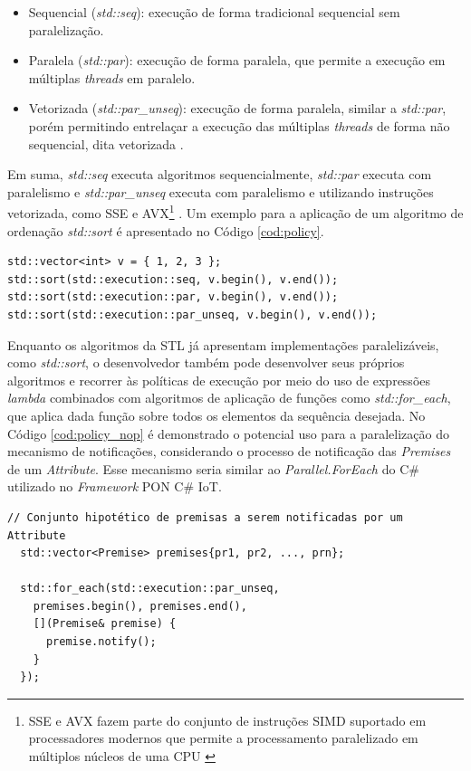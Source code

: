 \begin{itemize}
  \item Sequencial (\textit{std::seq}): execução de forma tradicional sequencial
        sem paralelização.
  \item Paralela (\textit{std::par}): execução de forma paralela, que permite a
        execução em múltiplas \textit{threads} em paralelo.
  \item Vetorizada (\textit{std::par\_unseq}): execução de forma paralela,
  similar a \textit{std::par}, porém permitindo entrelaçar a execução das
  múltiplas \textit{threads} de forma não sequencial, dita vetorizada \cite{c_stories_2018}.
\end{itemize}

Em suma, \textit{std::seq} executa algoritmos sequencialmente, \textit{std::par}
executa com paralelismo e \textit{std::par\_unseq} executa com paralelismo e
utilizando instruções vetorizada, como SSE e AVX\footnote{SSE e AVX fazem parte
do conjunto de instruções SIMD suportado em processadores modernos que permite a
processamento paralelizado em múltiplos núcleos de uma CPU
\cite{jeong2012performance}} \cite{c_stories_2018}. Um exemplo para a aplicação
de um algoritmo de ordenação \textit{std::sort} é apresentado no Código
\ref{cod:policy}.

\begin{lstlisting}[caption = {Uso de políticas de execução},
source = {Autoria própria}, float=htb,
label = {cod:policy}]
std::vector<int> v = { 1, 2, 3 };
std::sort(std::execution::seq, v.begin(), v.end());
std::sort(std::execution::par, v.begin(), v.end());
std::sort(std::execution::par_unseq, v.begin(), v.end());
\end{lstlisting}

Enquanto os algoritmos da STL já apresentam implementações paralelizáveis, como
\textit{std::sort}, o desenvolvedor também pode desenvolver seus próprios
algoritmos e recorrer às políticas de execução por meio do uso de expressões
\textit{lambda} combinados com algoritmos de aplicação de funções como
\textit{std::for\_each}, que aplica dada função sobre todos os elementos da
sequência desejada. No Código \ref{cod:policy_nop} é demonstrado o potencial uso
para a paralelização do mecanismo de notificações, considerando o processo de
notificação das \textit{Premises} de um \textit{Attribute}. Esse mecanismo seria
similar ao \textit{Parallel.ForEach} do C\# utilizado no \textit{Framework} PON
C\# IoT.

\begin{lstlisting}[caption = {Uso de políticas de execução no PON},
  source = {Autoria própria}, float=htb,
  label = {cod:policy_nop}]
  // Conjunto hipotético de premisas a serem notificadas por um Attribute  
  std::vector<Premise> premises{pr1, pr2, ..., prn};

  std::for_each(std::execution::par_unseq,
    premises.begin(), premises.end(),
    [](Premise& premise) {
      premise.notify();
    }
  });
\end{lstlisting}

